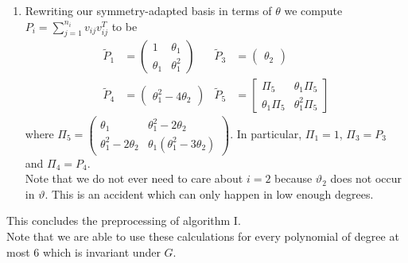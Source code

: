 \documentclass[]{article}
\begin{document}
\begin{enumerate}
    \item Rewriting our symmetry-adapted basis in terms of $\theta$ we compute $P_i=\sum_{j=1}^{n_i} v_{ij}v_{ij}^T$ to be
    \begin{align*}
        \tilde{P}_1&=\begin{pmatrix}1&\theta_1\\\theta_1&\theta_1^2\end{pmatrix}&
        \tilde{P}_3&=\begin{pmatrix}\theta_2\end{pmatrix}\\
        \tilde{P}_4&=\begin{pmatrix}\theta_1^2-4\theta_2\end{pmatrix}&
        \tilde{P}_5&=\begin{bmatrix}\Pi_5&\theta_1\Pi_5\\\theta_1\Pi_5&\theta_1^2\Pi_5\end{bmatrix}
    \end{align*}
    where $\Pi_5=\begin{pmatrix}\theta_1&\theta_1^2-2\theta_2\\\theta_1^2-2\theta_2&\theta_1(\theta_1^2-3\theta_2)\end{pmatrix}$. In particular, $\Pi_1=1$,  $\Pi_3=P_3$ and $\Pi_4=P_4$.\\
    Note that we do not ever need to care about $i=2$ because $\vartheta_2$ does not occur in $\vartheta$. This is an accident which can only happen in low enough degrees.\\
\end{enumerate}

This concludes the preprocessing of algorithm I.\\
Note that we are able to use these calculations for every polynomial of degree at most 6 which is invariant under $G$.\\
\end{document}
